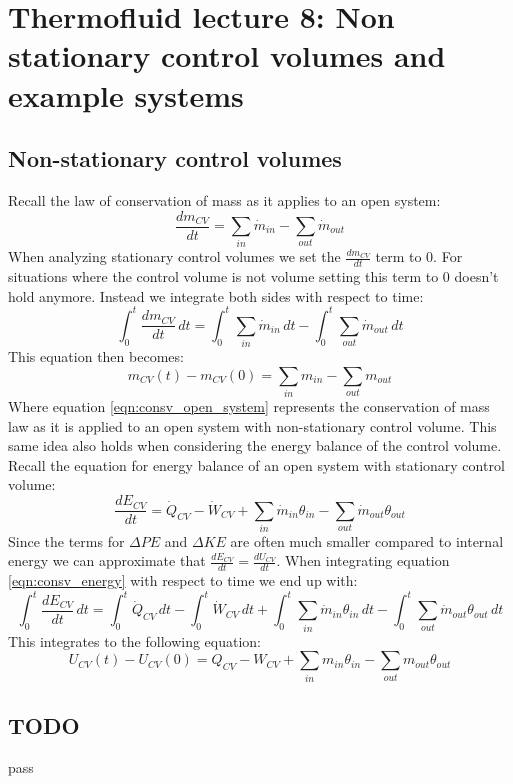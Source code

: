 \documentclass[11pt, a4paper]{article}
\begin{document}
\setcounter{section}{7}
\setcounter{equation}{0}

\section{Thermofluid lecture 8: Non stationary control volumes and example systems}

\subsection{Non-stationary control volumes}
Recall the law of conservation of mass as it applies to an open system:
\begin{equation}
  \frac{dm_{CV}}{dt} = \sum_{in} \dot{m}_{in} - \sum_{out} \dot{m}_{out}
\end{equation}
When analyzing stationary control volumes we set the $\frac{dm_{CV}}{dt}$ term to $0$. For situations where the control volume is not volume setting this term to $0$ doesn't hold anymore. Instead we integrate both sides with respect to time:
\begin{equation*}
  \int_{0}^{t} \frac{dm_{CV}}{dt}\,dt = \int_{0}^{t} \sum_{in} \dot{m}_{in} \, dt - \int_{0}^{t} \sum_{out} \dot{m}_{out} \, dt
\end{equation*}
This equation then becomes:
\begin{equation}
  \label{eqn:consv_open_system}
  m_{CV}(t) - m_{CV}(0) = \sum_{in} m_{in} - \sum_{out} m_{out}
\end{equation}
Where equation \ref{eqn:consv_open_system} represents the conservation of mass law as it is applied to an open system with non-stationary control volume. This same idea also holds when considering the energy balance of the control volume. Recall the equation for energy balance of an open system with stationary control volume:
\begin{equation}
  \label{eqn:consv_energy}
  \frac{dE_{CV}}{dt} = \dot{Q}_{CV} - \dot{W}_{CV} + \sum_{in} \dot{m}_{in} \theta_{in} - \sum_{out} \dot{m}_{out} \theta_{out}
\end{equation}
Since the terms for $\Delta PE$ and $\Delta KE$ are often much smaller compared to internal energy we can approximate that $\frac{dE_{CV}}{dt} = \frac{dU_{CV}}{dt}$. When integrating equation \ref{eqn:consv_energy} with respect to time we end up with:
\begin{equation*}
  \int_{0}^{t} \frac{dE_{CV}}{dt} \,dt = \int_{0}^{t} \dot{Q}_{CV} \, dt - \int_{0}^{t} \dot{W}_{CV} \, dt + \int_{0}^{t} \sum_{in} \dot{m}_{in} \theta_{in} \, dt - \int_{0}^{t} \sum_{out} \dot{m}_{out} \theta_{out} \, dt
\end{equation*}
This integrates to the following equation:
\begin{equation}
  U_{CV}(t) - U_{CV}(0) = Q_{CV} - W_{CV} + \sum_{in} m_{in} \theta_{in} - \sum_{out} m_{out} \theta_{out}  
\end{equation}


\subsection{TODO}
pass
\end{document}
